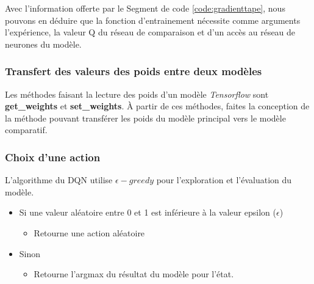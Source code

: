 \documentclass{article}
\begin{document}
\bigbreak
Avec l'information offerte par le Segment de code \ref{code:gradienttape}, nous pouvons en déduire que la fonction d'entrainement nécessite comme arguments l'expérience, la valeur Q du réseau de comparaison et d'un accès au réseau de neurones du modèle.

\subsubsection{Transfert des valeurs des poids entre deux modèles}
Les méthodes faisant la lecture des poids d'un modèle \textit{Tensorflow} sont \textbf{get\_weights} et \textbf{set\_weights}. À partir de ces méthodes, faites la conception de la méthode pouvant transférer les poids du modèle principal vers le modèle comparatif.

\subsubsection{Choix d'une action}
L'algorithme du DQN \citep{DQN-Article} utilise $\epsilon-greedy$ pour l'exploration et l'évaluation du modèle.

\bigbreak
\begin{itemize}
  \item Si une valeur aléatoire entre 0 et 1 est inférieure à la valeur epsilon ($\epsilon$)
  \begin{itemize}
    \item Retourne une action aléatoire
  \end{itemize}
  \item Sinon
  \begin{itemize}
    \item Retourne l'argmax du résultat du modèle pour l'état.
  \end{itemize}
\end{itemize}
\end{document}
